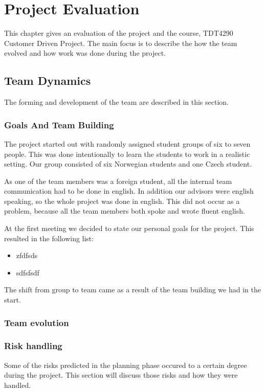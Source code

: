 \chapter{Project Evaluation}
This chapter gives an evaluation of the project and the course, TDT4290 Customer Driven Project. The main focus is to describe the how the team evolved and how work was done during the project.   

\section{Team Dynamics}
The forming and development of the team are described in this section.
\subsection{Goals And Team Building}
The project started out with randomly assigned student groups of six to seven people. This was done intentionally to learn the students to work in a realistic setting. Our group consisted of six Norwegian students and one Czech student. 

As one of the team members was a foreign student, all the internal team communication had to be done in english. In addition our advisors were english speaking, so the whole project was done in english. This did not occur as a problem, because all the team members both spoke and wrote fluent english.

At the first meeting we decided to state our personal goals for the project. This resulted in the following list:
\begin{itemize}
\item zfdfsds
\item sdfsfsdf
\end{itemize}


The shift from group to team came as a result of the team building we had in the start. 


\subsection{Team evolution}


\subsection{Risk handling}
Some of the risks predicted in the planning phase occured to a certain degree during the project.
This section will discuss those risks and how they were handled.

